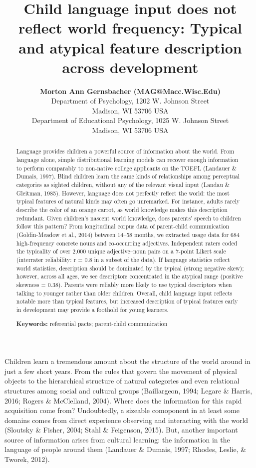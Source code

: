\documentclass[10pt, letterpaper]{article}
\title{Child language input does not reflect world frequency: Typical and
atypical feature description across development}
\author{{\large \bf Morton Ann Gernsbacher (MAG@Macc.Wisc.Edu)} \\ Department of Psychology, 1202 W. Johnson Street \\ Madison, WI 53706 USA \AND {\large \bf Sharon J.~Derry (SDJ@Macc.Wisc.Edu)} \\ Department of Educational Psychology, 1025 W. Johnson Street \\ Madison, WI 53706 USA}
\begin{document}
\maketitle

\begin{abstract}
Language provides children a powerful source of information about the
world. From language alone, simple distributional learning models can
recover enough information to perform comparably to non-native college
applicants on the TOEFL (Landauer \& Dumais, 1997). Blind children learn
the same kinds of relationships among perceptual categories as sighted
children, without any of the relevant visual input (Landau \& Gleitman,
1985). However, language does not perfectly reflect the world: the most
typical features of natural kinds may often go unremarked. For instance,
adults rarely describe the color of an orange carrot, as world knowledge
makes this description redundant. Given children's nascent world
knowledge, does parents' speech to children follow this pattern? From
longitudinal corpus data of parent-child communication (Goldin-Meadow et
al., 2014) between 14--58 months, we extracted usage data for 684
high-frequency concrete nouns and co-occurring adjectives. Independent
raters coded the typicality of over 2,000 unique adjective--noun pairs
on a 7-point Likert scale (interrater reliability: r = 0.8 in a subset
of the data). If language statistics reflect world statistics,
description should be dominated by the typical (strong negative skew);
however, across all ages, we see descriptors concentrated in the
atypical range (positive skewness = 0.38). Parents were reliably more
likely to use typical descriptors when talking to younger rather than
older children. Overall, child language input reflects notable more than
typical features, but increased description of typical features early in
development may provide a foothold for young learners.

\textbf{Keywords:}
referential pacts; parent-child communication
\end{abstract}

Children learn a tremendous amount about the structure of the world
around in just a few short years. From the rules that govern the
movement of physical objects to the hierarchical structure of natural
categories and even relational structures among social and cultural
groups (Baillargeon, 1994; Legare \& Harris, 2016; Rogers \& McClelland,
2004). Where does the information for this rapid acquisition come from?
Undoubtedly, a sizeable comoponent in at least some domains comes from
direct experience observing and interacting with the world (Sloutsky \&
Fisher, 2004; Stahl \& Feigenson, 2015). But, another important source
of information arises from cultural learning: the information in the
language of people around them (Landauer \& Dumais, 1997; Rhodes,
Leslie, \& Tworek, 2012).
\end{document}
